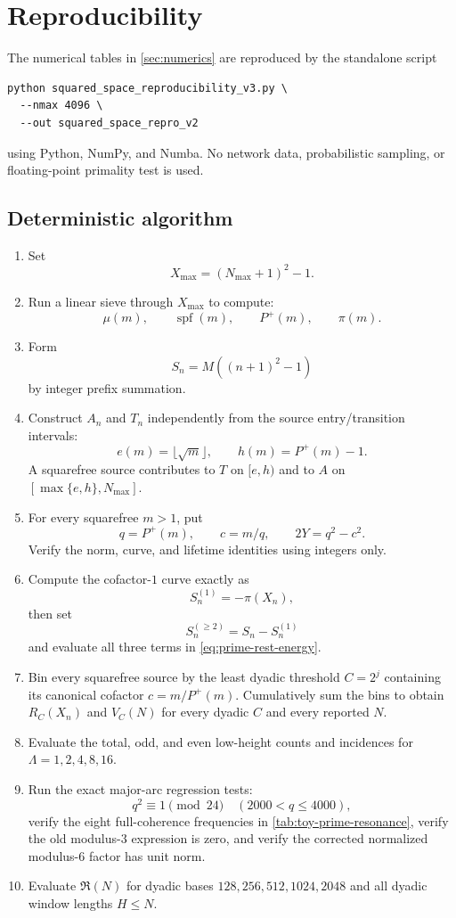 \documentclass[11pt]{article}
\theoremstyle{definition}
\theoremstyle{remark}
\newcommand{\Pplus}{P^{+}}
\newcommand{\1}{\mathbf{1}}
\begin{document}
\section{Reproducibility}
\label{app:reproducibility}

The numerical tables in \cref{sec:numerics} are reproduced by the
standalone script
\begin{verbatim}
python squared_space_reproducibility_v3.py \
  --nmax 4096 \
  --out squared_space_repro_v2
\end{verbatim}
using Python, NumPy, and Numba.  No network data, probabilistic
sampling, or floating-point primality test is used.

\subsection{Deterministic algorithm}

\begin{enumerate}[leftmargin=1.7em,itemsep=0.3em]
\item Set
\[
 X_{\max}=(N_{\max}+1)^2-1.
\]
\item Run a linear sieve through $X_{\max}$ to compute:
\[
 \mu(m),\qquad
 \operatorname{spf}(m),\qquad
 \Pplus(m),\qquad
 \pi(m).
\]
\item Form
\[
 S_n=M((n+1)^2-1)
\]
by integer prefix summation.
\item Construct $A_n$ and $T_n$ independently from the source
entry/transition intervals:
\[
 e(m)=\lfloor\sqrt m\rfloor,
 \qquad
 h(m)=\Pplus(m)-1.
\]
A squarefree source contributes to $T$ on $[e,h)$ and to $A$ on
$[\max\{e,h\},N_{\max}]$.
\item For every squarefree $m>1$, put
\[
 q=\Pplus(m),
 \qquad
 c=m/q,
 \qquad
 2Y=q^2-c^2.
\]
Verify the norm, curve, and lifetime identities using integers only.
\item Compute the cofactor-$1$ curve exactly as
\[
 S_n^{(1)}=-\pi(X_n),
\]
then set
\[
 S_n^{(\ge2)}=S_n-S_n^{(1)}
\]
and evaluate all three terms in
\cref{eq:prime-rest-energy}.
\item Bin every squarefree source by the least dyadic threshold
$C=2^j$ containing its canonical cofactor $c=m/\Pplus(m)$.  Cumulatively
sum the bins to obtain $R_C(X_n)$ and $V_C(N)$ for every dyadic $C$ and
every reported $N$.
\item Evaluate the total, odd, and even low-height counts and incidences
for $\Lambda=1,2,4,8,16$.
\item Run the exact major-arc regression tests:
\[
 q^2\equiv1\pmod{24}\quad(2000<q\le4000),
\]
verify the eight full-coherence frequencies in
\cref{tab:toy-prime-resonance}, verify the old modulus-$3$ expression is zero,
and verify the corrected normalized modulus-$6$ factor has unit norm.
\item Evaluate $\mathfrak R(N)$ for dyadic bases
$128,256,512,1024,2048$ and all dyadic window lengths $H\le N$.
\end{enumerate}
\end{document}
